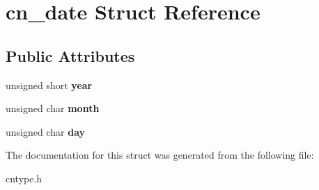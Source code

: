 \hypertarget{structcn__date}{\section{cn\-\_\-date Struct Reference}
\label{structcn__date}
}
\subsection*{Public Attributes}
\begin{DoxyCompactItemize}
\item 
\hypertarget{structcn__date_a1afd2d50152ab728f69cbff933a7c343}{unsigned short {\bfseries year}}\label{structcn__date_a1afd2d50152ab728f69cbff933a7c343}

\item 
\hypertarget{structcn__date_aba6817a320e51bb19f2c8edd02a629a9}{unsigned char {\bfseries month}}\label{structcn__date_aba6817a320e51bb19f2c8edd02a629a9}

\item 
\hypertarget{structcn__date_ac1c992c42ab26c72643dff03f5f56b27}{unsigned char {\bfseries day}}\label{structcn__date_ac1c992c42ab26c72643dff03f5f56b27}

\end{DoxyCompactItemize}


The documentation for this struct was generated from the following file\-:\begin{DoxyCompactItemize}
\item 
cntype.\-h\end{DoxyCompactItemize}
